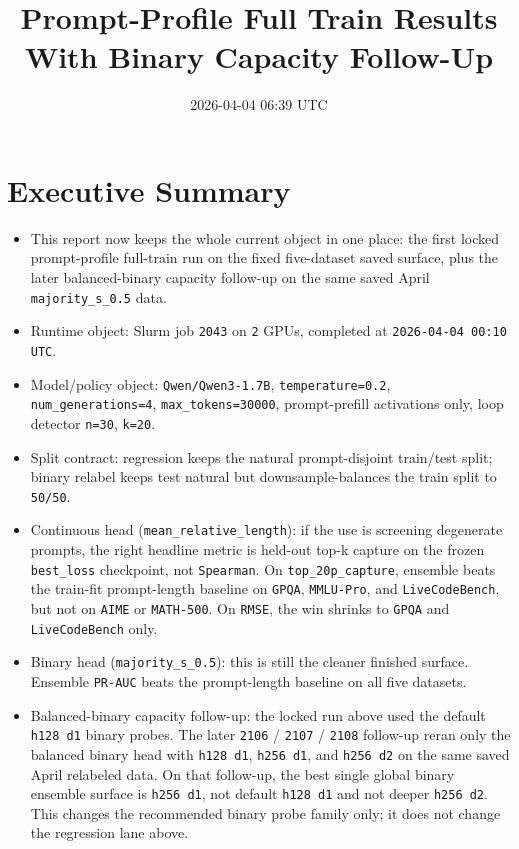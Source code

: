 \documentclass[11pt]{article}
\title{Prompt-Profile Full Train Results With Binary Capacity Follow-Up}
\author{}
\date{2026-04-04 06:39 UTC}
\begin{document}
\maketitle

\section*{Executive Summary}
\begin{itemize}[leftmargin=1.5em]
\item This report now keeps the whole current object in one place: the first locked prompt-profile full-train run on the fixed five-dataset saved surface, plus the later balanced-binary capacity follow-up on the same saved April \texttt{majority\_s\_0.5} data.
\item Runtime object: Slurm job \texttt{2043} on \texttt{2} GPUs, completed at \texttt{2026-04-04 00:10 UTC}.
\item Model/policy object: \texttt{Qwen/Qwen3-1.7B}, \texttt{temperature=0.2}, \texttt{num\_generations=4}, \texttt{max\_tokens=30000}, prompt-prefill activations only, loop detector \texttt{n=30}, \texttt{k=20}.
\item Split contract: regression keeps the natural prompt-disjoint train/test split; binary relabel keeps test natural but downsample-balances the train split to \texttt{50/50}.
\item Continuous head (\texttt{mean\_relative\_length}): if the use is screening degenerate prompts, the right headline metric is held-out top-k capture on the frozen \texttt{best\_loss} checkpoint, not \texttt{Spearman}. On \texttt{top\_20p\_capture}, ensemble beats the train-fit prompt-length baseline on \texttt{GPQA}, \texttt{MMLU-Pro}, and \texttt{LiveCodeBench}, but not on \texttt{AIME} or \texttt{MATH-500}. On \texttt{RMSE}, the win shrinks to \texttt{GPQA} and \texttt{LiveCodeBench} only.
\item Binary head (\texttt{majority\_s\_0.5}): this is still the cleaner finished surface. Ensemble \texttt{PR-AUC} beats the prompt-length baseline on all five datasets.
\item Balanced-binary capacity follow-up: the locked run above used the default \texttt{h128 d1} binary probes. The later \texttt{2106} / \texttt{2107} / \texttt{2108} follow-up reran only the balanced binary head with \texttt{h128 d1}, \texttt{h256 d1}, and \texttt{h256 d2} on the same saved April relabeled data. On that follow-up, the best single global binary ensemble surface is \texttt{h256 d1}, not default \texttt{h128 d1} and not deeper \texttt{h256 d2}. This changes the recommended binary probe family only; it does not change the regression lane above.

\end{itemize}
\end{document}
